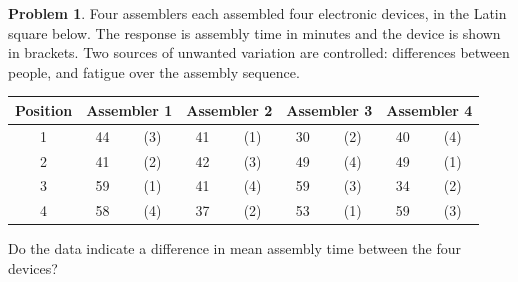 \documentclass[11pt,a4paper]{article}
\theoremstyle{definition}
\newtheorem{problemx}{Problem}[section]
\newenvironment{problem}{\begin{problemx}}{\end{problemx}}
\begin{document}
\begin{problem}
Four assemblers each assembled four electronic devices, in the Latin square below. The
response is assembly time in minutes and the device is shown in brackets. Two sources of
unwanted variation are controlled: differences between people, and fatigue over the assembly
sequence.
\begin{table}[H]
\centering
\begin{tabular}{|c|cc|cc|cc|cc|}
\hline
Position & \multicolumn{2}{c|}{Assembler 1} & \multicolumn{2}{c|}{Assembler 2} & \multicolumn{2}{c|}{Assembler 3} & \multicolumn{2}{c|}{Assembler 4}\\
\hline
1 & 44 & (3) & 41 & (1) & 30 & (2) & 40 & (4)\\
2 & 41 & (2) & 42 & (3) & 49 & (4) & 49 & (1)\\
3 & 59 & (1) & 41 & (4) & 59 & (3) & 34 & (2)\\
4 & 58 & (4) & 37 & (2) & 53 & (1) & 59 & (3)\\
\hline
\end{tabular}
\end{table}
Do the data indicate a difference in mean assembly time between the four devices?
\end{problem}
\end{document}

